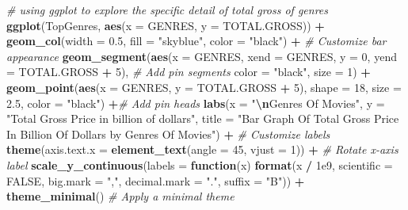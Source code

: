 \documentclass[
]{article}
\newenvironment{Shaded}{\begin{snugshade}}{\end{snugshade}}
\newcommand{\AttributeTok}[1]{\textcolor[rgb]{0.13,0.29,0.53}{#1}}
\newcommand{\CommentTok}[1]{\textcolor[rgb]{0.56,0.35,0.01}{\textit{#1}}}
\newcommand{\ConstantTok}[1]{\textcolor[rgb]{0.56,0.35,0.01}{#1}}
\newcommand{\ControlFlowTok}[1]{\textcolor[rgb]{0.13,0.29,0.53}{\textbf{#1}}}
\newcommand{\DecValTok}[1]{\textcolor[rgb]{0.00,0.00,0.81}{#1}}
\newcommand{\FloatTok}[1]{\textcolor[rgb]{0.00,0.00,0.81}{#1}}
\newcommand{\FunctionTok}[1]{\textcolor[rgb]{0.13,0.29,0.53}{\textbf{#1}}}
\newcommand{\NormalTok}[1]{#1}
\newcommand{\SpecialCharTok}[1]{\textcolor[rgb]{0.81,0.36,0.00}{\textbf{#1}}}
\newcommand{\StringTok}[1]{\textcolor[rgb]{0.31,0.60,0.02}{#1}}
\begin{document}
\begin{Shaded}
\begin{Highlighting}[]
\CommentTok{\# using ggplot to explore the specific detail of total gross of genres}
\FunctionTok{ggplot}\NormalTok{(TopGenres, }\FunctionTok{aes}\NormalTok{(}\AttributeTok{x =}\NormalTok{ GENRES, }\AttributeTok{y =}\NormalTok{ TOTAL.GROSS)) }\SpecialCharTok{+}
  \FunctionTok{geom\_col}\NormalTok{(}\AttributeTok{width =} \FloatTok{0.5}\NormalTok{, }\AttributeTok{fill =} \StringTok{"skyblue"}\NormalTok{, }\AttributeTok{color =} \StringTok{"black"}\NormalTok{) }\SpecialCharTok{+}  \CommentTok{\# Customize bar appearance}
  \FunctionTok{geom\_segment}\NormalTok{(}\FunctionTok{aes}\NormalTok{(}\AttributeTok{x =}\NormalTok{ GENRES, }\AttributeTok{xend =}\NormalTok{ GENRES, }\AttributeTok{y =} \DecValTok{0}\NormalTok{, }\AttributeTok{yend =}\NormalTok{ TOTAL.GROSS }\SpecialCharTok{+} \DecValTok{5}\NormalTok{),  }\CommentTok{\# Add pin segments}
               \AttributeTok{color =} \StringTok{"black"}\NormalTok{, }\AttributeTok{size =} \DecValTok{1}\NormalTok{) }\SpecialCharTok{+}
  \FunctionTok{geom\_point}\NormalTok{(}\FunctionTok{aes}\NormalTok{(}\AttributeTok{x =}\NormalTok{ GENRES, }\AttributeTok{y =}\NormalTok{ TOTAL.GROSS }\SpecialCharTok{+} \DecValTok{5}\NormalTok{), }\AttributeTok{shape =} \DecValTok{18}\NormalTok{, }\AttributeTok{size =} \FloatTok{2.5}\NormalTok{, }\AttributeTok{color =} \StringTok{"black"}\NormalTok{) }\SpecialCharTok{+}\CommentTok{\# Add pin heads}
  \FunctionTok{labs}\NormalTok{(}\AttributeTok{x =} \StringTok{"}\SpecialCharTok{\textbackslash{}n}\StringTok{Genres Of Movies"}\NormalTok{, }\AttributeTok{y =} \StringTok{"Total Gross Price in billion of dollars"}\NormalTok{, }\AttributeTok{title =} \StringTok{"Bar Graph Of Total Gross Price In Billion Of Dollars by Genres Of Movies"}\NormalTok{) }\SpecialCharTok{+}  \CommentTok{\# Customize labels}
  \FunctionTok{theme}\NormalTok{(}\AttributeTok{axis.text.x =} \FunctionTok{element\_text}\NormalTok{(}\AttributeTok{angle =} \DecValTok{45}\NormalTok{, }\AttributeTok{vjust =} \DecValTok{1}\NormalTok{)) }\SpecialCharTok{+}  \CommentTok{\# Rotate x{-}axis label}
\FunctionTok{scale\_y\_continuous}\NormalTok{(}\AttributeTok{labels =} \ControlFlowTok{function}\NormalTok{(x) }\FunctionTok{format}\NormalTok{(x }\SpecialCharTok{/} \FloatTok{1e9}\NormalTok{, }\AttributeTok{scientific =} \ConstantTok{FALSE}\NormalTok{, }\AttributeTok{big.mark =} \StringTok{","}\NormalTok{, }\AttributeTok{decimal.mark =} \StringTok{"."}\NormalTok{, }\AttributeTok{suffix =} \StringTok{"B"}\NormalTok{)) }\SpecialCharTok{+}
  \FunctionTok{theme\_minimal}\NormalTok{() }\CommentTok{\# Apply a minimal theme}
\end{Highlighting}
\end{Shaded}
\end{document}
